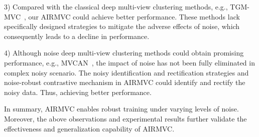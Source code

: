 \documentclass{article}
\theoremstyle{plain}
\theoremstyle{definition}
\theoremstyle{remark}
\begin{document}
3) Compared with the classical deep multi-view clustering methods, e.g., TGM-MVC~\cite{TGM-MVC}, our AIRMVC could achieve better performance. These methods lack specifically designed strategies to mitigate the adverse effects of noise, which consequently leads to a decline in performance. 

4) Although noise deep multi-view clustering methods could obtain promising performance, e.g., MVCAN~\cite{MVCAN}, the impact of noise has not been fully eliminated in complex noisy scenario. The noisy identification and rectification strategies and noise-robust contrastive mechanism in AIRMVC could identify and rectify the noisy data. Thus, achieving better performance.

In summary, AIRMVC enables robust training under varying levels of noise. Moreover, the above observations and experimental results further validate the effectiveness and generalization capability of AIRMVC.


\begin{table}[]
\centering
\caption{Performance variation of multi-view clustering on WebKB dataset in noisy scenario with 10\% noisy ratio.}
\label{decrese}
\vspace{-20pt}
\end{table}
\end{document}
